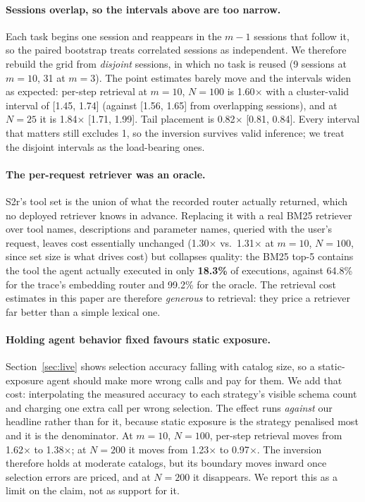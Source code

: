 \documentclass[11pt]{article}
\begin{document}
\paragraph{Sessions overlap, so the intervals above are too narrow.} Each task begins one session and reappears in the $m-1$ sessions that follow it, so the paired bootstrap treats correlated sessions as independent. We therefore rebuild the grid from \emph{disjoint} sessions, in which no task is reused (9 sessions at $m{=}10$, 31 at $m{=}3$). The point estimates barely move and the intervals widen as expected: per-step retrieval at $m{=}10$, $N{=}100$ is 1.60$\times$ with a cluster-valid interval of [1.45, 1.74] (against [1.56, 1.65] from overlapping sessions), and at $N{=}25$ it is 1.84$\times$ [1.71, 1.99]. Tail placement is 0.82$\times$ [0.81, 0.84]. Every interval that matters still excludes 1, so the inversion survives valid inference; we treat the disjoint intervals as the load-bearing ones.

\paragraph{The per-request retriever was an oracle.} S2r's tool set is the union of what the recorded router actually returned, which no deployed retriever knows in advance. Replacing it with a real BM25 retriever over tool names, descriptions and parameter names, queried with the user's request, leaves cost essentially unchanged (1.30$\times$ vs.\ 1.31$\times$ at $m{=}10$, $N{=}100$, since set size is what drives cost) but collapses quality: the BM25 top-5 contains the tool the agent actually executed in only \textbf{18.3\%} of executions, against 64.8\% for the trace's embedding router and 99.2\% for the oracle. The retrieval cost estimates in this paper are therefore \emph{generous} to retrieval: they price a retriever far better than a simple lexical one.

\paragraph{Holding agent behavior fixed favours static exposure.} Section~\ref{sec:live} shows selection accuracy falling with catalog size, so a static-exposure agent should make more wrong calls and pay for them. We add that cost: interpolating the measured accuracy to each strategy's visible schema count and charging one extra call per wrong selection. The effect runs \emph{against} our headline rather than for it, because static exposure is the strategy penalised most and it is the denominator. At $m{=}10$, $N{=}100$, per-step retrieval moves from 1.62$\times$ to 1.38$\times$; at $N{=}200$ it moves from 1.23$\times$ to 0.97$\times$. The inversion therefore holds at moderate catalogs, but its boundary moves inward once selection errors are priced, and at $N{=}200$ it disappears. We report this as a limit on the claim, not as support for it.
\end{document}
